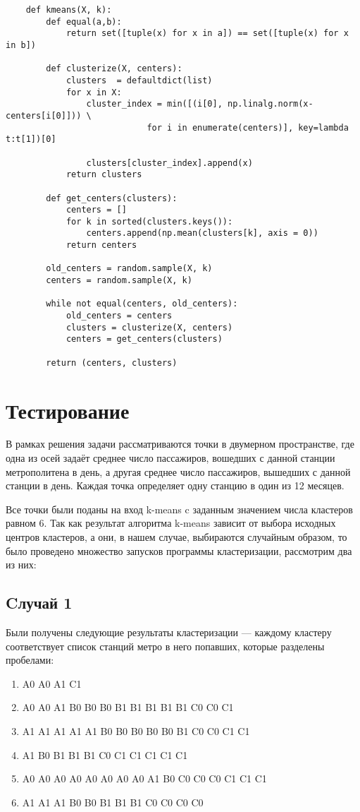 \documentclass[12pt,a4paper,oneside]{extarticle}
\begin{document}
    \begin{lstlisting}
    def kmeans(X, k):
        def equal(a,b):
            return set([tuple(x) for x in a]) == set([tuple(x) for x in b])

        def clusterize(X, centers):
            clusters  = defaultdict(list)
            for x in X:
                cluster_index = min([(i[0], np.linalg.norm(x-centers[i[0]])) \
                            for i in enumerate(centers)], key=lambda t:t[1])[0]

                clusters[cluster_index].append(x)
            return clusters
        
        def get_centers(clusters):
            centers = []
            for k in sorted(clusters.keys()):
                centers.append(np.mean(clusters[k], axis = 0))
            return centers
            
        old_centers = random.sample(X, k)
        centers = random.sample(X, k)

        while not equal(centers, old_centers):
            old_centers = centers        
            clusters = clusterize(X, centers)        
            centers = get_centers(clusters)

        return (centers, clusters)

    \end{lstlisting}

\section{Тестирование}
    В рамках решения задачи рассматриваются точки в двумерном пространстве, где одна из осей задаёт среднее число пассажиров, вошедших с данной станции метрополитена в день, а другая среднее число пассажиров, вышедших с данной станции в день. Каждая точка определяет одну станцию в один из 12 месяцев.

    Все точки были поданы на вход k-means c заданным значением числа кластеров равном 6. Так как результат алгоритма k-means зависит от выбора исходных центров кластеров, а они, в нашем случае, выбираются случайным образом, то было проведено множество запусков программы кластеризации, рассмотрим два из них:

    \subsection{Cлучай 1}
        Были получены следующие результаты кластеризации --- каждому кластеру соответствует список станций метро в него попавших, которые разделены пробелами:
        \begin{enumerate}
            \item A0 A0 A1 C1
            \item A0 A0 A1 B0 B0 B0 B1 B1 B1 B1 B1 C0 C0 C1
            \item A1 A1 A1 A1 A1 B0 B0 B0 B0 B0 B1 C0 C0 C1 C1
            \item A1 B0 B1 B1 B1 C0 C1 C1 C1 C1 C1
            \item A0 A0 A0 A0 A0 A0 A0 A0 A1 B0 C0 C0 C0 C1 C1 C1
            \item A1 A1 A1 B0 B0 B1 B1 B1 C0 C0 C0 C0
        \end{enumerate}
\end{document}
